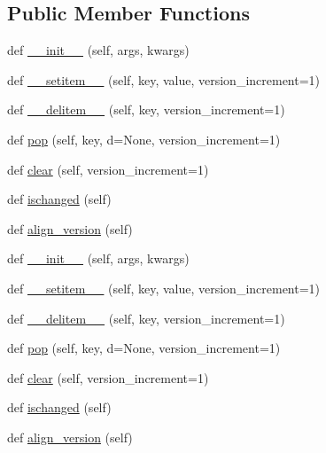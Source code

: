 \subsection*{Public Member Functions}
\begin{DoxyCompactItemize}
\item 
def \hyperlink{classremi_1_1gui_1_1__VersionedDictionary_a368090f9fb719664910474f128a00948}{\+\_\+\+\_\+init\+\_\+\+\_\+} (self, args, kwargs)
\item 
def \hyperlink{classremi_1_1gui_1_1__VersionedDictionary_a7d6e0439fc9588d469cf39c4b1b37e29}{\+\_\+\+\_\+setitem\+\_\+\+\_\+} (self, key, value, version\+\_\+increment=1)
\item 
def \hyperlink{classremi_1_1gui_1_1__VersionedDictionary_a05cbb94364218c8156c57418f2fdabf5}{\+\_\+\+\_\+delitem\+\_\+\+\_\+} (self, key, version\+\_\+increment=1)
\item 
def \hyperlink{classremi_1_1gui_1_1__VersionedDictionary_a909eb28346814808e5054d31fb0e2e9a}{pop} (self, key, d=None, version\+\_\+increment=1)
\item 
def \hyperlink{classremi_1_1gui_1_1__VersionedDictionary_a113edc6da20e8dfc509242cb36d1a452}{clear} (self, version\+\_\+increment=1)
\item 
def \hyperlink{classremi_1_1gui_1_1__VersionedDictionary_afd97a72c323df62e15281ebc92be2077}{ischanged} (self)
\item 
def \hyperlink{classremi_1_1gui_1_1__VersionedDictionary_a43182b9aeea82c60b2246329cc59ae54}{align\+\_\+version} (self)
\item 
def \hyperlink{classremi_1_1gui_1_1__VersionedDictionary_a368090f9fb719664910474f128a00948}{\+\_\+\+\_\+init\+\_\+\+\_\+} (self, args, kwargs)
\item 
def \hyperlink{classremi_1_1gui_1_1__VersionedDictionary_a7d6e0439fc9588d469cf39c4b1b37e29}{\+\_\+\+\_\+setitem\+\_\+\+\_\+} (self, key, value, version\+\_\+increment=1)
\item 
def \hyperlink{classremi_1_1gui_1_1__VersionedDictionary_a05cbb94364218c8156c57418f2fdabf5}{\+\_\+\+\_\+delitem\+\_\+\+\_\+} (self, key, version\+\_\+increment=1)
\item 
def \hyperlink{classremi_1_1gui_1_1__VersionedDictionary_a909eb28346814808e5054d31fb0e2e9a}{pop} (self, key, d=None, version\+\_\+increment=1)
\item 
def \hyperlink{classremi_1_1gui_1_1__VersionedDictionary_a113edc6da20e8dfc509242cb36d1a452}{clear} (self, version\+\_\+increment=1)
\item 
def \hyperlink{classremi_1_1gui_1_1__VersionedDictionary_afd97a72c323df62e15281ebc92be2077}{ischanged} (self)
\item 
def \hyperlink{classremi_1_1gui_1_1__VersionedDictionary_a43182b9aeea82c60b2246329cc59ae54}{align\+\_\+version} (self)
\end{DoxyCompactItemize}


